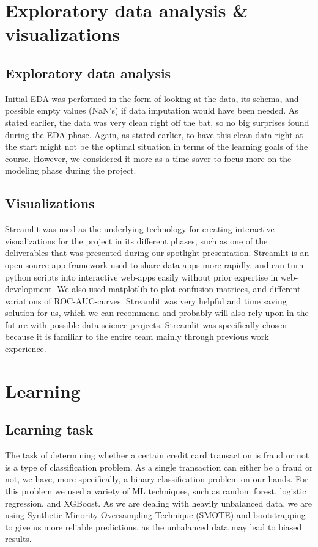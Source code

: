 \documentclass{article}
\begin{document}
\section{Exploratory data analysis \& visualizations}

\subsection{Exploratory data analysis}

Initial EDA was performed in the form of looking at the data, its schema, and possible empty values (NaN's) if data imputation would have been needed. As stated earlier, the data was very clean right off the bat, so no big surprises found during the EDA phase. Again, as stated earlier, to have this clean data right at the start might not be the optimal situation in terms of the learning goals of the course. However, we considered it more as a time saver to focus more on the modeling phase during the project.

\subsection{Visualizations}

Streamlit was used as the underlying technology for creating interactive visualizations for the project in its different phases, such as one of the deliverables that was presented during our spotlight presentation. Streamlit is an open-source app framework used to share data apps more rapidly, and can turn python scripts into interactive web-apps easily without prior expertise in web-development. We also used matplotlib to plot confusion matrices, and different variations of ROC-AUC-curves. Streamlit was very helpful and time saving solution for us, which we can recommend and probably will also rely upon in the future with possible data science projects. Streamlit was specifically chosen because it is familiar to the entire team mainly through previous work experience.

\section{Learning}

\subsection{Learning task}

The task of determining whether a certain credit card transaction is fraud or not is a type of classification problem. As a single transaction can either be a fraud or not, we have, more specifically, a binary classification problem on our hands. For this problem we used a variety of ML techniques, such as random forest, logistic regression, and XGBoost. As we are dealing with heavily unbalanced data, we are using Synthetic Minority Oversampling Technique (SMOTE) and bootstrapping to give us more reliable predictions, as the unbalanced data may lead to biased results.
\end{document}
